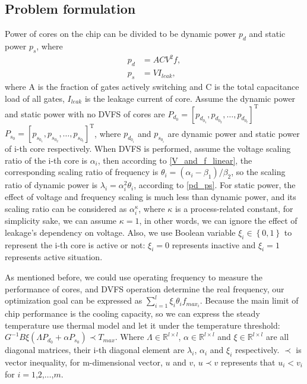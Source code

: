 \subsection{Problem formulation}
Power of cores on the chip can be divided to be dynamic power $p_d$ and static power $p_s$, where
\begin{equation}\label{pd_ps}
\begin{split}
p_d&=A C V^2 f, \\
p_s&=V I_{leak},
\end{split}
\end{equation}
where A is the fraction of gates actively switching and C is the total capacitance load of all gates, $I_{leak}$ is the leakage current of
core.
Assume the dynamic power and static power with no DVFS of cores are $P_{d_0}=[p_{d_{0_1}},p_{d_{0_2}},\ldots,p_{d_{0_l}}]^ \mathrm{ T }$
$P_{s_0}=[p_{s_{0_1}},p_{s_{0_2}},\ldots,p_{s_{0_l}}]^ \mathrm{ T }$, where $p_{d_{0_i}}$ and $p_{s_{0_i}}$ are dynamic power and static power
of i-th core respectively. When DVFS is performed, assume the voltage scaling ratio of the i-th core is $\alpha_i$, then according to \eqref{V_and_f_linear},
the corresponding scaling ratio of frequency is $\theta_i = (\alpha_i-\beta_1)/\beta_2$, so the scaling ratio of dynamic power is $\lambda_i=\alpha_i^2 \theta_i$, according
to \eqref{pd_ps}. For static power, the effect of voltage and frequency scaling is much less than dynamic power, and its scaling ratio can be considered
as $\alpha_i^\kappa$, where $\kappa$ is a process-related constant, for simplicity sake, we can assume $\kappa=1$, in other words, we can ignore
the effect of leakage's dependency on voltage. Also, we use Boolean variable $\xi_i \in \left\{0,1\right\}$ to represent the i-th core is active or
not: $\xi_i=0$ represents inactive and $\xi_i=1$ represents active situation.

As mentioned before, we could use operating frequency to measure the performance of cores, and DVFS operation determine the real frequency, our
optimization goal can be expressed as $\sum_{i=1}^l \xi_i \theta_i f_{max_i}$. Because the main limit of chip performance is the cooling capacity,
so we can express the steady temperature use thermal model and let it under the temperature threshold:
$G^{-1} B \xi \left( \Lambda P_{d_0} + \alpha P_{s_0} \right) \prec T_{max}$.
Where $\Lambda \in \mathbb{R}^{l \times l} $, $\alpha \in \mathbb{R}^{l \times l} $ and $\xi \in \mathbb{R}^{l \times l}$ are all diagonal matrices,
their i-th diagonal element are $\lambda_i$, $\alpha_i$ and $\xi_i$ respectively. $\prec$ is vector inequality, for m-dimensional vector, $u$ and $v$,
$u \prec v$ represents that $u_i < v_i$ for $i = 1$,$2$,$\ldots$,$m$.

